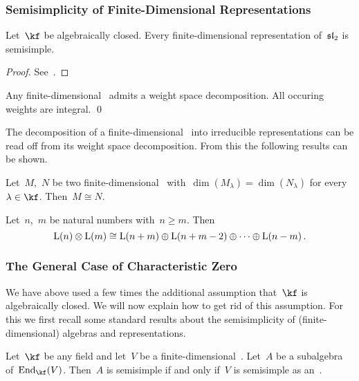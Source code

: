 \documentclass[a4paper, 11pt, oneside]{scrartcl}
\begin{document}
\subsubsection{Semisimplicity of Finite-Dimensional Representations}

\begin{theorem}[Weyl]
  Let~$\kf$ be algebraically closed.
  Every finite-dimensional representation of~$\mathfrak{sl}_2$ is semisimple.
\end{theorem}

\begin{proof}
  See~\cite[Theorem~6.3]{humphreys_lie_algebras}.
\end{proof}

\begin{corollary}
  Any finite-dimensional~ admits a weight space decomposition.
  All occuring weights are integral.
  \qed
\end{corollary}

The decomposition of a finite-dimensional~ into irreducible representations can be read off from its weight space decomposition.
From this the following results can be shown.

\begin{lemma}
  Let~$M$,~$N$ be two finite-dimensional~ with~$\dim(M_\lambda) = \dim(N_\lambda)$ for every~$\lambda \in \kf$.
  Then~$M \cong N$.
\end{lemma}

\begin{corollary}
  Let~$n$,~$m$ be natural numbers with~$n \geq m$.
  Then
  \[
    \operatorname{L}(n) \otimes \operatorname{L}(m)
    \cong
    \operatorname{L}(n + m) \oplus \operatorname{L}(n + m - 2) \oplus \dotsb \oplus \operatorname{L}(n - m) \,.
  \]
\end{corollary}

\subsubsection{The General Case of Characteristic Zero}

We have above used a few times the additional assumption that~$\kf$ is algebraically closed.
We will now explain how to get rid of this assumption.
For this we first recall some standard results about the semisimplicity of (finite-dimensional) algebras and representations.

\begin{lemma}
  \label{semisimplicity via faithful representation}
  Let~$\kf$ be any field and let~$V$ be a finite-dimensional~\vectorspaces{$\kf$}.
  Let~$A$ be a subalgebra of~$\End_{\kf}(V)$.
  Then~$A$ is semisimple if and only if~$V$ is semisimple as an~.
\end{lemma}
\end{document}

